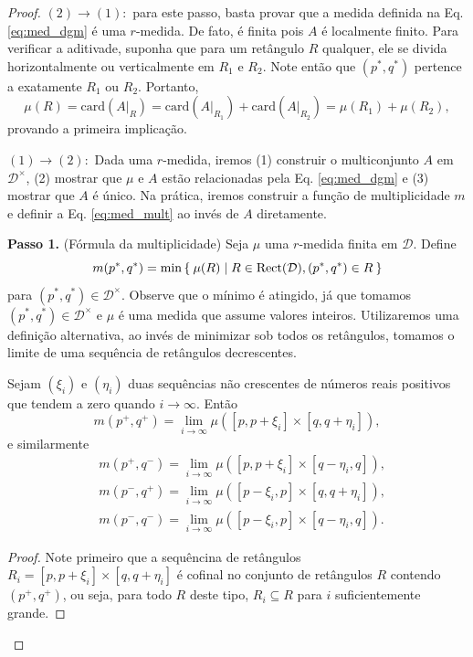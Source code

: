 \begin{proof}
$(2) \to (1):$ para este passo, basta provar que a medida definida na Eq. \eqref{eq:med_dgm} é uma $r$-medida.
De fato, é finita pois $A$ é localmente finito. Para verificar a aditivade, suponha que para um retângulo
$R$ qualquer, ele se divida horizontalmente ou verticalmente em $R_1$ e $R_2$. Note então que $(p^*,q^*)$
pertence a exatamente $R_1$ ou $R_2$. Portanto, 
\begin{equation*}
    \mu(R) = \text{card}(\left.A\right|_R) = \text{card}(\left.A\right|_{R_1}) + \text{card}(\left.A\right|_{R_2})
     = \mu(R_1) + \mu(R_2),
\end{equation*}
provando a primeira implicação. 

\noindent$(1) \to (2):$ Dada uma $r$-medida, iremos (1) construir o multiconjunto $A$ em $\mathcal{D}^\times$,
(2) mostrar que $\mu$ e $A$ estão relacionadas pela Eq. \eqref{eq:med_dgm} e (3) mostrar que $A$ é único. Na 
prática, iremos construir a função de multiplicidade $m$ e definir a Eq. \eqref{eq:med_mult} ao invés de $A$ diretamente.

\textbf{Passo 1.} (Fórmula da multiplicidade) Seja $\mu$ uma $r$-medida finita em $\mathcal{D}$. Define
\begin{equation}
    m(p^*, q^*) = \min \Set{\mu(R) | R \in \text{Rect}(\mathcal{D}), (p^*, q^*) \in R}
\end{equation}  
para $(p^*, q^*) \in \mathcal{D}^\times$. Observe que o mínimo é atingido, já que tomamos $(p^*, q^*) \in \mathcal{D}^\times$
e $\mu$ é uma medida que assume valores inteiros. Utilizaremos uma definição alternativa, ao invés de minimizar sob 
todos os retângulos, tomamos o limite de uma sequência de retângulos decrescentes.  
\begin{lem}\label{teo:lem_med}
    Sejam $(\xi_i)$ e $(\eta_i)$ duas sequências não crescentes de números reais positivos
    que tendem a zero quando $i \to \infty$. Então
    \begin{equation*}
        m(p^+, q^+) = \lim_{i\to\infty} \mu([p,p+\xi_i] \times [q, q+\eta_i]),
    \end{equation*}
    e similarmente
    \begin{align*}
        & m(p^+, q^-) = \lim_{i\to\infty} \mu([p,p+\xi_i] \times [q-\eta_i, q]), \\
        & m(p^-, q^+) = \lim_{i\to\infty} \mu([p-\xi_i,p] \times [q, q+\eta_i]), \\
        & m(p^-, q^-) = \lim_{i\to\infty} \mu([p-\xi_i,p] \times [q-\eta_i,q]).
    \end{align*}
\end{lem}
\begin{proof}
    Note primeiro que a sequêncina de retângulos $R_i = [p, p+\xi_i] \times [q, q+\eta_i]$ é 
    cofinal no conjunto de retângulos $R$ contendo $(p^+, q^+)$, ou seja, para todo $R$ deste 
    tipo, $R_i \subseteq R$ para $i$ suficientemente grande.
    

\end{proof}
\end{proof}
